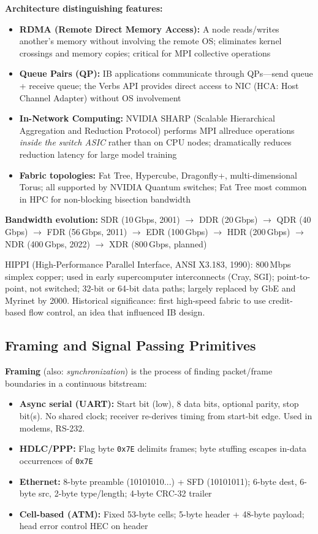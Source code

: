 \documentclass[11pt,letterpaper]{article}
\begin{document}
\textbf{Architecture distinguishing features:}
\begin{itemize}[noitemsep]
  \item \textbf{RDMA (Remote Direct Memory Access):} A node reads/writes another's memory without involving the remote OS; eliminates kernel crossings and memory copies; critical for MPI collective operations
  \item \textbf{Queue Pairs (QP):} IB applications communicate through QPs---send queue + receive queue; the Verbs API provides direct access to NIC (HCA: Host Channel Adapter) without OS involvement
  \item \textbf{In-Network Computing:} NVIDIA SHARP (Scalable Hierarchical Aggregation and Reduction Protocol) performs MPI allreduce operations \emph{inside the switch ASIC} rather than on CPU nodes; dramatically reduces reduction latency for large model training
  \item \textbf{Fabric topologies:} Fat Tree, Hypercube, Dragonfly+, multi-dimensional Torus; all supported by NVIDIA Quantum switches; Fat Tree most common in HPC for non-blocking bisection bandwidth
\end{itemize}

\textbf{Bandwidth evolution:}
SDR (10\,Gbps, 2001) $\to$ DDR (20\,Gbps) $\to$ QDR (40\,Gbps) $\to$ FDR (56\,Gbps, 2011) $\to$ EDR (100\,Gbps) $\to$ HDR (200\,Gbps) $\to$ NDR (400\,Gbps, 2022) $\to$ XDR (800\,Gbps, planned)

HIPPI (High-Performance Parallel Interface, ANSI X3.183, 1990): 800\,Mbps simplex copper; used in early supercomputer interconnects (Cray, SGI); point-to-point, not switched; 32-bit or 64-bit data paths; largely replaced by GbE and Myrinet by 2000. Historical significance: first high-speed fabric to use credit-based flow control, an idea that influenced IB design.

\subsection{Framing and Signal Passing Primitives}

\textbf{Framing} (also: \emph{synchronization}) is the process of finding packet/frame boundaries in a continuous bitstream:
\begin{itemize}[noitemsep]
  \item \textbf{Async serial (UART):} Start bit (low), 8 data bits, optional parity, stop bit(s). No shared clock; receiver re-derives timing from start-bit edge. Used in modems, RS-232.
  \item \textbf{HDLC/PPP:} Flag byte \texttt{0x7E} delimits frames; byte stuffing escapes in-data occurrences of \texttt{0x7E}
  \item \textbf{Ethernet:} 8-byte preamble (10101010...) + SFD (10101011); 6-byte dest, 6-byte src, 2-byte type/length; 4-byte CRC-32 trailer
  \item \textbf{Cell-based (ATM):} Fixed 53-byte cells; 5-byte header + 48-byte payload; head error control HEC on header
\end{itemize}
\end{document}
